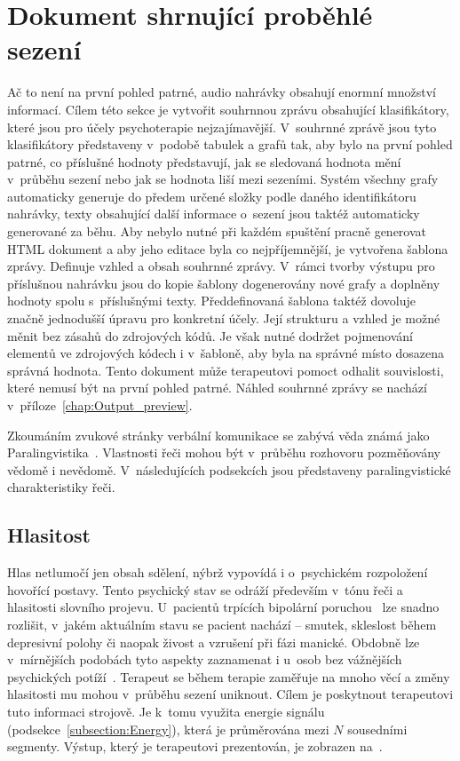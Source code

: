 \section{Dokument shrnující proběhlé sezení}
\label{section:Stats}
Ač to není na první pohled patrné, audio nahrávky obsahují enormní množství informací. Cílem této sekce je vytvořit souhrnnou zprávu obsahující klasifikátory, které jsou pro účely psychoterapie nejzajímavější. V~souhrnné zprávě jsou tyto klasifikátory představeny v~podobě tabulek a grafů tak, aby bylo na první pohled patrné, co příslušné hodnoty představují, jak se sledovaná hodnota mění v~průběhu sezení nebo jak se hodnota liší mezi sezeními. Systém všechny grafy automaticky generuje do předem určené složky podle daného identifikátoru nahrávky, texty obsahující další informace o~sezení jsou taktéž automaticky generované za běhu. Aby nebylo nutné při každém spuštění pracně generovat HTML dokument a aby jeho editace byla co nejpříjemnější, je vytvořena šablona zprávy. Definuje vzhled a obsah souhrnné zprávy. V~rámci tvorby výstupu pro příslušnou nahrávku jsou do kopie šablony dogenerovány nové grafy a doplněny hodnoty spolu s~příslušnými texty. Předdefinovaná šablona taktéž dovoluje značně jednodušší úpravu pro konkretní účely. Její strukturu a vzhled je možné měnit bez zásahů do zdrojových kódů. Je však nutné dodržet pojmenování elementů ve zdrojových kódech i v~šabloně, aby byla na správné místo dosazena správná hodnota. Tento dokument může terapeutovi pomoct odhalit souvislosti, které nemusí být na první pohled patrné. Náhled souhrnné zprávy se nachází v~příloze~\ref{chap:Output_preview}. 

Zkoumáním zvukové stránky verbální komunikace se zabývá věda známá jako Paralingvistika~\cite{krivohlavy}. Vlastnosti řeči mohou být v~průběhu rozhovoru pozměňovány vědomě i nevědomě. V~následujících podsekcích jsou představeny paralingvistické charakteristiky řeči.


\subsection{Hlasitost}
Hlas netlumočí jen obsah sdělení, nýbrž vypovídá i o~psychickém rozpoložení hovořící postavy. Tento psychický stav se odráží především v~tónu řeči a hlasitosti slovního projevu. U~pacientů trpících bipolární poruchou~\cite{bipolar} lze snadno rozlišit, v~jakém aktuálním stavu se pacient nachází – smutek, skleslost během depresivní polohy či naopak živost a vzrušení při fázi manické. Obdobně lze v~mírnějších podobách tyto aspekty zaznamenat i u~osob bez vážnějších psychických potíží~\cite{krivohlavy}. Terapeut se během terapie zaměřuje na mnoho věcí a změny hlasitosti mu mohou v~průběhu sezení uniknout. Cílem je poskytnout terapeutovi tuto informaci strojově. Je k~tomu využita energie signálu (podsekce~\ref{subsection:Energy}), která je průměrována mezi $N$ sousedními segmenty. Výstup, který je terapeutovi prezentován, je zobrazen na~.

